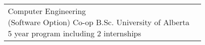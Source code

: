 \documentclass[a4paper]{modernsimplecv}
\begin{document}

\subsection*{}
\vspace{-4em}

\setlength{\columnsep}{0.03\textwidth}
\small
\begin{paracol}{2}
    \begin{minipage}[t]{\leftcolwidth}
        \vspace{1em}
        \section*{}
        \begin{tabular}{@{\raggedright}p{} |>{\raggedright\arraybackslash}p{}}
            \cvdegree
                {2017--2022}
                {Computer Engineering \newline (Software Option) Co-op}
                {B.Sc.}
                {University of Alberta\newline}
                {5 year program including 2 internships}\\
        \end{tabular}

        \vspace{-2pt}
        \section*{}
        

\end{minipage}
\end{paracol}
\end{document}

